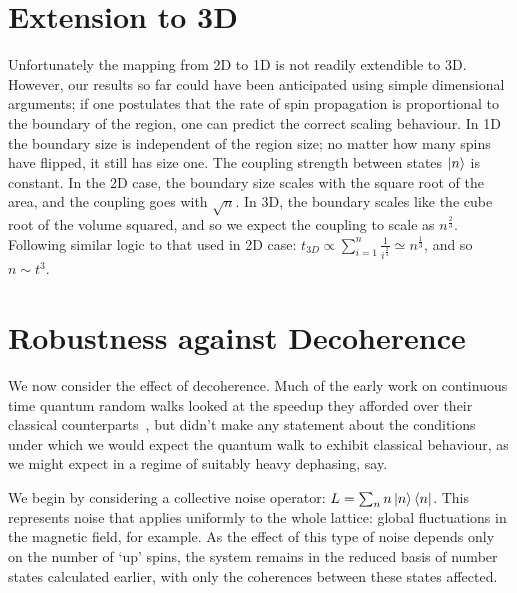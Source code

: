 \section{Extension to 3D}

Unfortunately the mapping from 2D to 1D is not readily extendible to 3D. However, our results so far could have been anticipated using simple dimensional arguments; if one postulates that the rate of spin propagation is proportional to the boundary of the region, one can predict the correct scaling behaviour. In 1D the boundary size is independent of the region size; no matter how many spins have flipped, it still has size one. The coupling strength between states $\left\vert n\right\rangle$ is constant. In the 2D case, the boundary size scales with the square root of the area, and the coupling goes with $\sqrt{n}$. In 3D, the boundary scales like the cube root of the volume squared, and so we expect the coupling to scale as $n^{\frac{2}{3}}$. Following similar logic to that used in 2D case: $t_{3D}\propto \sum_{i=1}^{n}\frac{1}{i^\frac{2}{3}}\simeq n^{\frac{1}{3}}$, and so $n \sim t^3$.  


\section{Robustness against Decoherence}

We now consider the effect of decoherence. Much of the early work on continuous time quantum random walks looked at the speedup they afforded over their classical counterparts~\cite{Farhi:1998p6471}, but didn't make  any statement about the conditions under which we would expect the quantum walk to exhibit classical behaviour, as we might expect in a regime of suitably heavy dephasing, say.

We begin by considering a collective noise operator: $ L=\sum_{n}n\left\vert n\right\rangle\left\langle n\right\vert$.  This represents noise that applies uniformly to the whole lattice: global fluctuations in the magnetic field, for example. As the effect of this type of noise depends only on the number of `up' spins, the system remains in the reduced basis of number states calculated earlier, with only the coherences between these states affected.

